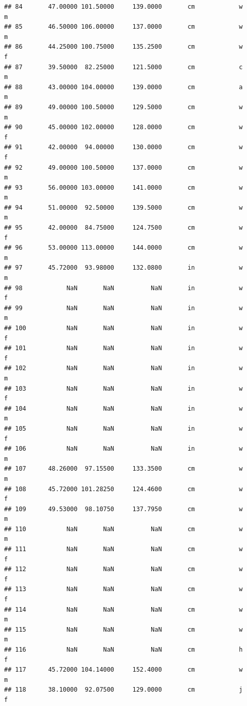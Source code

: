 \documentclass[]{article}
\begin{document}
\begin{verbatim}
## 84       47.00000 101.50000     139.0000       cm            w         m
## 85       46.50000 106.00000     137.0000       cm            w         m
## 86       44.25000 100.75000     135.2500       cm            w         f
## 87       39.50000  82.25000     121.5000       cm            c         m
## 88       43.00000 104.00000     139.0000       cm            a         m
## 89       49.00000 100.50000     129.5000       cm            w         m
## 90       45.00000 102.00000     128.0000       cm            w         f
## 91       42.00000  94.00000     130.0000       cm            w         f
## 92       49.00000 100.50000     137.0000       cm            w         m
## 93       56.00000 103.00000     141.0000       cm            w         m
## 94       51.00000  92.50000     139.5000       cm            w         m
## 95       42.00000  84.75000     124.7500       cm            w         f
## 96       53.00000 113.00000     144.0000       cm            w         m
## 97       45.72000  93.98000     132.0800       in            w         m
## 98            NaN       NaN          NaN       in            w         f
## 99            NaN       NaN          NaN       in            w         m
## 100           NaN       NaN          NaN       in            w         f
## 101           NaN       NaN          NaN       in            w         f
## 102           NaN       NaN          NaN       in            w         m
## 103           NaN       NaN          NaN       in            w         f
## 104           NaN       NaN          NaN       in            w         m
## 105           NaN       NaN          NaN       in            w         f
## 106           NaN       NaN          NaN       in            w         m
## 107      48.26000  97.15500     133.3500       cm            w         m
## 108      45.72000 101.28250     124.4600       cm            w         f
## 109      49.53000  98.10750     137.7950       cm            w         m
## 110           NaN       NaN          NaN       cm            w         m
## 111           NaN       NaN          NaN       cm            w         f
## 112           NaN       NaN          NaN       cm            w         f
## 113           NaN       NaN          NaN       cm            w         f
## 114           NaN       NaN          NaN       cm            w         m
## 115           NaN       NaN          NaN       cm            w         m
## 116           NaN       NaN          NaN       cm            h         f
## 117      45.72000 104.14000     152.4000       cm            w         m
## 118      38.10000  92.07500     129.0000       cm            j         f

\end{verbatim}
\end{document}
